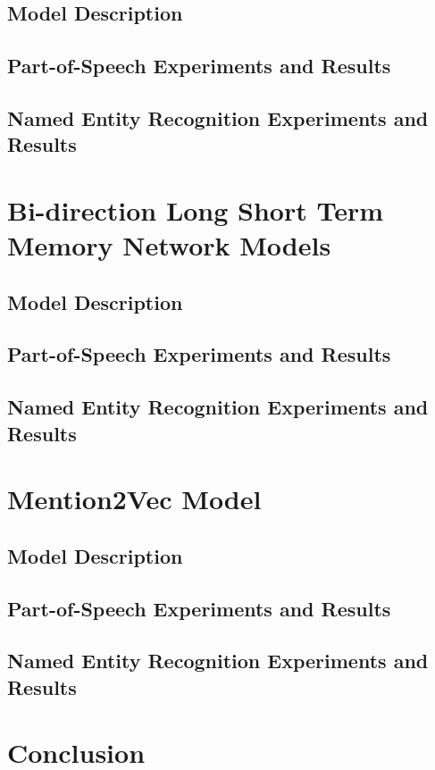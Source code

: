\documentclass{sfuthesis}
\begin{document}
\section{Model Description}
\section{Part-of-Speech Experiments and Results}
\section{Named Entity Recognition Experiments and Results}

\chapter{Bi-direction Long Short Term Memory Network Models}
\section{Model Description}
\section{Part-of-Speech Experiments and Results}
\section{Named Entity Recognition Experiments and Results}

\chapter{Mention2Vec Model}
\section{Model Description}
\section{Part-of-Speech Experiments and Results}
\section{Named Entity Recognition Experiments and Results}

\chapter{Conclusion}
\end{document}
